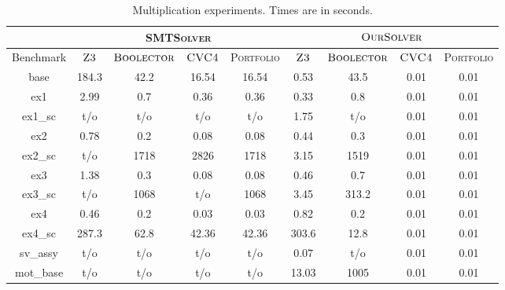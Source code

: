 \begin{table}[t]
\centering
\caption{Multiplication experiments. Times are in seconds.}
\label{my-label}
\begin{tabular}{|c|c|c|c|c|c|c|c|c|}
\hline
                      & \multicolumn{4}{c|}{\textsc{SMTSolver}}                    & \multicolumn{4}{c|}{$\textsc{OurSolver}$}                              \\ \hline
Benchmark             & $\textsc{Z3}$ & $\textsc{Boolector}$ & $\textsc{CVC4}$ & \textsc{Portfolio} & $\textsc{Z3}$ & $\textsc{Boolector}$ & $\textsc{CVC4}$ & \textsc{Portfolio} \\ \hline
base                  & 184.3    & 42.2         & 16.54      & 16.54                & 0.53      & 43.5         & 0.01       & 0.01                 \\ \hline
ex1                   & 2.99      & 0.7          & 0.36       & 0.36                 & 0.33      & 0.8          & 0.01       & 0.01                 \\ \hline
ex1\_sc         & t/o       & t/o          & t/o        & t/o                  & 1.75      & t/o          & 0.01       & 0.01                 \\ \hline
ex2                   & 0.78      & 0.2          & 0.08       & 0.08                 & 0.44      & 0.3          & 0.01       & 0.01                 \\ \hline
ex2\_sc         & t/o       & 1718       & 2826    & 1718               & 3.15      & 1519       & 0.01       & 0.01                 \\ \hline
ex3                   & 1.38      & 0.3          & 0.08       & 0.08                 & 0.46      & 0.7          & 0.01       & 0.01                 \\ \hline
ex3\_sc         & t/o       & 1068       & t/o        & 1068               & 3.45      & 313.2        & 0.01       & 0.01                 \\ \hline
ex4         & 0.46      & 0.2          & 0.03       & 0.03                 & 0.82      & 0.2          & 0.01       & 0.01                 \\ \hline
ex4\_sc     & 287.3    & 62.8         & 42.36      & 42.36                & 303.6    & 12.8         & 0.01       & 0.01                 \\ \hline
sv\_assy              & t/o       & t/o          & t/o        & t/o                  & 0.07      & t/o          & 0.01       & 0.01                 \\ \hline
mot\_base   & t/o       & t/o          & t/o        & t/o                  & 13.03     & 1005       & 0.01       & 0.01                 \\ \hline

\end{tabular}
\end{table}
